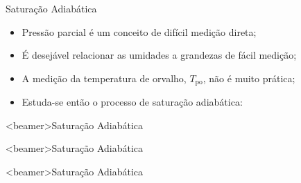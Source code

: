     \begin{frame}{Saturação Adiabática}\vspace*{-2em}
        \begin{itemize}
            \item<1-> \alert{Pressão parcial} é um conceito de \alert{difícil medição direta};
                \\[\bigskipamount]
            \item<2-> É desejável relacionar as umidades a grandezas de \alert{fácil medição};
                \\[\bigskipamount]
            \item<3-> A medição da temperatura de orvalho, \alert{$T_{\mathrm{po}}$}, não é
                muito prática;
                \\[\bigskipamount]
            \item<4-> Estuda-se então o processo de \alert{saturação adiabática}:
        \end{itemize}
    \end{frame}

    \begin{frame}<beamer>{Saturação Adiabática}\vspace*{-2em}
    \end{frame}

    \begin{frame}<beamer>{Saturação Adiabática}\vspace*{-2em}
    \end{frame}

    \begin{frame}<beamer>{Saturação Adiabática}\vspace*{-2em}
    \end{frame}

